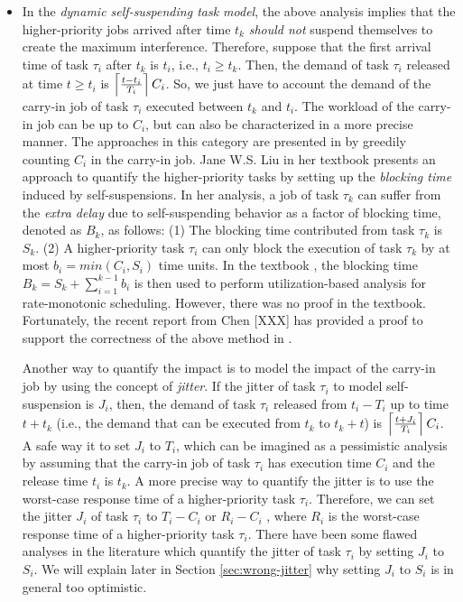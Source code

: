 \begin{itemize}
\begin{itemize}
\item In the \emph{dynamic self-suspending task model}, the above analysis implies that the higher-priority jobs arrived after time $t_k$ \emph{should not} suspend themselves to create the maximum interference. Therefore, suppose that the first arrival time of task $\tau_i$ after $t_k$ is $t_i$, i.e., $t_i \geq t_k$. Then, the demand of task $\tau_i$ released at time $t \geq t_i$ is $\left\lceil{\frac{t-t_i}{T_i} }\right\rceil C_i$. So, we just have to account the demand of the carry-in job of task $\tau_i$ executed between $t_k$ and $t_i$. The workload of the carry-in job can be up to $C_i$, but can also be characterized in a more precise manner. The approaches in this category are presented in \cite{huangpass:dac2015,LiuChen:rtss2014} by greedily counting $C_i$ in the carry-in job. Jane W.S. Liu in her textbook \cite[Page 164-165]{Liu:2000:RS:518501} presents an approach to quantify the higher-priority tasks by setting up the \emph{blocking time} induced by self-suspensions. In her analysis, a job of task $\tau_k$ can suffer from the \emph{extra delay} due to self-suspending behavior as a factor of blocking time, denoted as $B_k$, as follows: (1) The blocking time contributed from task $\tau_k$ is $S_k$. (2) A higher-priority task $\tau_i$ can only block the execution of task $\tau_k$ by at most $b_i=min(C_i, S_i)$ time units. In the textbook \cite{Liu:2000:RS:518501}, the blocking time $B_k=S_k+\sum_{i=1}^{k-1} b_i$ is then used to perform utilization-based analysis for rate-monotonic scheduling. However, there was no proof in the textbook. Fortunately, the recent report from Chen [XXX] has provided a proof to support the correctness of the above method in \cite{Liu:2000:RS:518501}.

\vspace{0.1in}


Another way to quantify the impact is to model the impact of the carry-in job by using the concept of \emph{jitter}. If the jitter of task $\tau_i$ to model self-suspension is $J_i$, then, the demand of task $\tau_i$ released from $t_i-T_i$ up to time $t+t_k$  (i.e., the demand that can be executed from $t_k$ to $t_k+t$) is $\left\lceil{\frac{t+J_i}{T_i} }\right\rceil C_i$. A safe way it to set $J_i$ to $T_i$, which can be imagined as a pessimistic analysis by assuming that the carry-in job of task $\tau_i$ has execution time $C_i$ and the release time $t_i$ is $t_k$. A more precise way to quantify the jitter is to use the worst-case response time of a higher-priority task $\tau_i$. Therefore, we can set the jitter $J_i$ of task $\tau_i$ to $T_i-C_i$ \cite{huangpass:dac2015,Raj:suspension1991} or  $R_i-C_i$ \cite{huangpass:dac2015}, where $R_i$ is the worst-case response time of a higher-priority task $\tau_i$. There have been some flawed analyses in the literature \cite{ECRTS-AudsleyB04,RTAS-AudsleyB04,RTCSA-KimCPKH95} which quantify the jitter of task $\tau_i$ by setting $J_i$ to $S_i$. We will explain later in Section \ref{sec:wrong-jitter} why setting $J_i$ to $S_i$ is in general too optimistic. 


\end{itemize}
\end{itemize}
